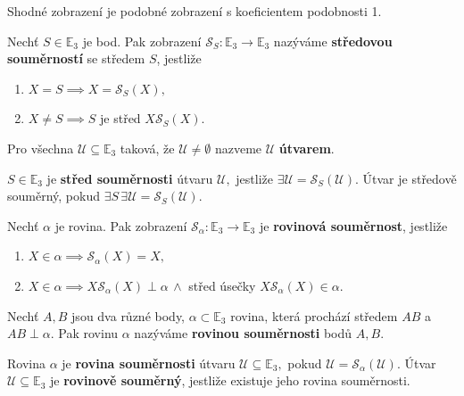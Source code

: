 \begin{pozn}
    Shodné zobrazení je podobné zobrazení s koeficientem podobnosti 1.
\end{pozn}

\begin{definition}
    Nechť $S\in \mathbb E_3$ je bod. Pak zobrazení $\mathscr S_S\colon \mathbb E_3 \to
    \mathbb E_3$ nazýváme \textbf{středovou souměrností} se středem $S$, jestliže
    \begin{enumerate}[$i.$]
    \item $X=S\implies X=\mathscr S_S(X),$
   	\item $X\ne S \implies S$ je střed $X\mathscr S_S(X).$
    \end{enumerate}
\end{definition}

\begin{definition}
    Pro všechna $\mathscr U \subseteq \mathbb E_3$ taková, že $\mathscr U\ne \emptyset$ nazveme $\mathscr
    U$ \textbf{útvarem}.
\end{definition}

\begin{definition}
    $S\in \mathbb E_3$ je \textbf{střed souměrnosti} útvaru $\mathscr U,$ jestliže
    $\exists \mathscr U = \mathscr S_S(\mathscr U).$ Útvar je středově souměrný,
    pokud $\exists S\,\exists\mathscr U = \mathscr S_S(\mathscr U).$
\end{definition}

\begin{definition}
    Nechť $\alpha$ je rovina. Pak zobrazení $\mathscr S_\alpha\colon\mathbb E_3 \to
    \mathbb E_3$ je \textbf{rovinová souměrnost}, jestliže
    \begin{enumerate}[$i.$]
    \item $X\in\alpha\implies \mathscr S_\alpha(X)=X,$
   	\item $X\in\alpha\implies X\mathscr S_\alpha(X) \perp\alpha\,\land$ střed úsečky
    $X\mathscr S_\alpha(X)\in \alpha.$
    \end{enumerate}
\end{definition}

\begin{definition}
    Nechť $A,B$ jsou dva různé body, $\alpha \subset \mathbb E_3$ rovina, která
    prochází středem $AB$ a $AB\perp \alpha$. Pak rovinu $\alpha$ nazýváme
    \textbf{rovinou souměrnosti} bodů $A,B.$
\end{definition}

\begin{definition}
Rovina $\alpha$ je \textbf{rovina souměrnosti} útvaru $\mathscr U\subseteq \mathbb E_3,$
pokud $\mathscr U = \mathscr S_\alpha(\mathscr U)$. Útvar $\mathscr U \subseteq \mathbb E_3$ je \textbf{rovinově souměrný}, jestliže existuje jeho rovina souměrnosti.
\end{definition}

